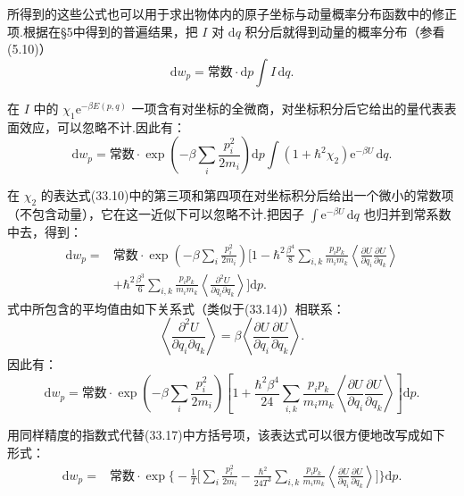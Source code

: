 所得到的这些公式也可以用于求出物体内的原子坐标与动量概率分布函数中的修正项.根据在§5中得到的普遍结果，把 $I$ 对 $\mathrm{d}q$ 积分后就得到动量的概率分布（参看(5.10)）
\begin{equation*}
  \mathrm{d}w_p=\text{常数}\cdot\mathrm{d}p\int I\,\mathrm{d}q.
\end{equation*}

在 $I$ 中的 $\chi_1\mathrm{e}^{-\beta E(p,q)}$ 一项含有对坐标的全微商，对坐标积分后它给出的量代表表面效应，可以忽略不计.因此有：
\begin{equation*}
  \mathrm{d}w_p=\text{常数}\cdot\exp\left(-\beta\sum_i\frac{p_i^2}{2m_i}\right)\mathrm{d}p
  \int\left(1+\hbar^2\chi_2\right)\mathrm{e}^{-\beta U}\,\mathrm{d}q.
\end{equation*}

在 $\chi_2$ 的表达式(33.10)中的第三项和第四项在对坐标积分后给出一个微小的常数项（不包含动量），它在这一近似下可以忽略不计.把因子 $\int\mathrm{e}^{-\beta U}\,\mathrm{d}q$ 也归并到常系数中去，得到：
\begin{equation*}
\begin{aligned}
  \mathrm{d}w_p={}&\text{常数}\cdot\exp\left(-\beta\sum_i\frac{p_i^2}{2m_i}\right)
  \bigg[1-\hbar^2\frac{\beta^4}{8}\sum_{i,k}\frac{p_ip_k}{m_im_k}
  \left\langle\frac{\partial U}{\partial q_i}\frac{\partial U}{\partial q_k}\right\rangle\\
  &+\hbar^2\frac{\beta^3}{6}\sum_{i,k}\frac{p_ip_k}{m_im_k}
  \left\langle\frac{\partial^2U}{\partial q_i\partial q_k}\right\rangle\bigg]\mathrm{d}p.
\end{aligned}
\end{equation*}
式中所包含的平均值由如下关系式（类似于(33.14)）相联系：
\begin{equation*}
  \left\langle\frac{\partial^2U}{\partial q_i\partial q_k}\right\rangle
  =\beta\left\langle\frac{\partial U}{\partial q_i}\frac{\partial U}{\partial q_k}\right\rangle.
\end{equation*}
因此有：
\begin{equation}
  \mathrm{d}w_p=\text{常数}\cdot\exp\left(-\beta\sum_i\frac{p_i^2}{2m_i}\right)
  \left[1+\frac{\hbar^2\beta^4}{24}\sum_{i,k}\frac{p_ip_k}{m_im_k}
  \left\langle\frac{\partial U}{\partial q_i}\frac{\partial U}{\partial q_k}\right\rangle\right]\mathrm{d}p.
\end{equation}

用同样精度的指数式代替(33.17)中方括号项，该表达式可以很方便地改写成如下形式：
\begin{equation}
\begin{aligned}
  \mathrm{d}w_p={}&\text{常数}\cdot\exp\bigg\{-\frac{1}{T}\bigg[\sum_i\frac{p_i^2}{2m_i}
  -\frac{\hbar^2}{24T^3}\sum_{i,k}\frac{p_ip_k}{m_im_k}
  \left\langle\frac{\partial U}{\partial q_i}\frac{\partial U}{\partial q_k}\right\rangle\bigg]\bigg\}\mathrm{d}p.
\end{aligned}
\end{equation}

